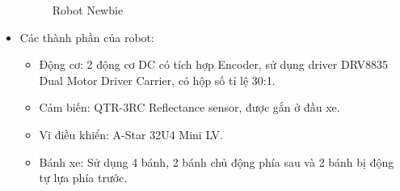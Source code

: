 \begin{itemize}
\begin{figure}[H]
\begin{subfigure}{0.7\textwidth}
                \label{chap1_pic12b}
                \end{subfigure}
                \caption{Robot Newbie}
                \label{chap1_pic12}
            \end{figure}
            \item Các thành phần của robot:
                \begin{itemize}[label=\textendash]
                    \item Động cơ: 2 động cơ DC có tích hợp Encoder, sử dụng driver DRV8835 Dual Motor Driver Carrier, có hộp số tỉ lệ 30:1.
                    \item Cảm biến:  QTR-3RC Reflectance sensor, được gắn ở đầu xe.
                    \item Vi điều khiển: 	A-Star 32U4 Mini LV.
                    \item Bánh xe: Sử dụng 4 bánh, 2 bánh chủ động phía sau và 2 bánh bị động tự lựa phía trước.
                \end{itemize}
        \end{itemize}



